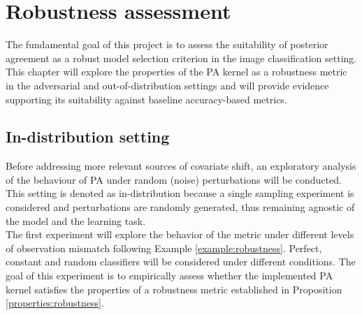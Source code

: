 \chapter{Robustness assessment}\label{chapter:robustness_assessment}

The fundamental goal of this project is to assess the suitability of posterior
agreement as a robust model selection criterion in the image classification setting.
This chapter will explore the properties of the PA kernel as a robustness metric in the
adversarial and out-of-distribution settings and will provide evidence supporting 
its suitability against baseline accuracy-based metrics.

\section{In-distribution setting}\label{sec:results_robustness}

Before addressing more relevant sources of covariate shift, an exploratory analysis
of the behaviour of PA under random (noise) perturbations will be conducted. This
setting is denoted as in-distribution because a single sampling experiment is 
considered and perturbations are randomly generated, thus remaining agnostic of the
model and the learning task. \\

The first experiment will explore the behavior of the metric under different levels of 
observation mismatch following Example \ref{example:robustness}. Perfect, constant and random
classifiers will be considered under different conditions. The goal of this
experiment is to empirically assess whether the implemented PA kernel satisfies the 
properties of a robustness metric established in Proposition \ref{properties:robustness}.


